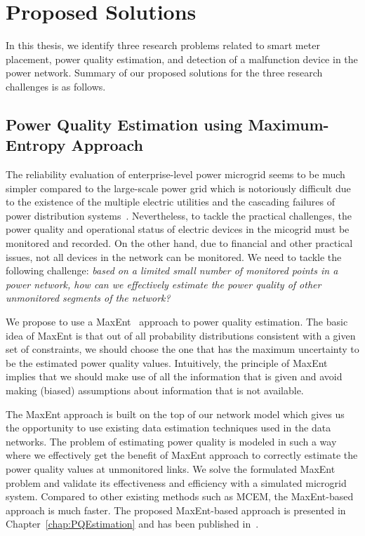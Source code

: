 \section{Proposed Solutions}
In this thesis, we identify three research problems related to smart meter placement, power quality estimation, and detection of a malfunction device in the power network. Summary of our proposed solutions for the three research challenges is as follows.

\subsection{Power Quality Estimation using Maximum-Entropy Approach}
The reliability evaluation of enterprise-level power microgrid seems to be much simpler compared to the large-scale power grid which is notoriously difficult due to the existence of the multiple electric utilities and the cascading failures of power distribution systems~\cite{Albert04}. Nevertheless, to tackle the practical challenges, the power quality and operational status of electric devices in the micogrid must be monitored and recorded. On the other hand, due to financial and other practical issues, not all devices in the network can be monitored. We need to tackle the following challenge: \textit{based on a limited small number of monitored points in a power network, how can we effectively estimate the power quality of other unmonitored segments of the network?}

We propose to use a MaxEnt~\cite{maxent} approach to power quality estimation. The basic idea of MaxEnt is that out of all probability distributions consistent with a given set of constraints, we should choose the one that has the maximum uncertainty to be the estimated power quality values. Intuitively, the principle of MaxEnt implies that we should make use of all the information that is given and avoid making (biased) assumptions about information that is not available.

The MaxEnt approach is built on the top of our network model which gives us the opportunity to use existing data estimation techniques used in the data networks. The problem of estimating power quality is modeled in such a way where we effectively get the benefit of MaxEnt approach to correctly estimate the power quality values at unmonitored links. We solve the formulated MaxEnt problem and validate its effectiveness and efficiency with a simulated microgrid system. Compared to other existing methods such as MCEM, the MaxEnt-based approach is much faster. The proposed MaxEnt-based approach is presented in Chapter~\ref{chap:PQEstimation} and has been published in~\cite{ali2013maximum}.

